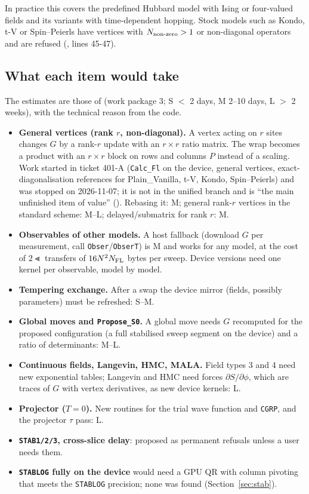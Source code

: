 In practice this covers the predefined Hubbard model with Ising or four-valued fields and its variants with time-dependent hopping. Stock models such as Kondo, t-V or Spin--Peierls have vertices with $N_{\rm non\text{-}zero}>1$ or non-diagonal operators and are refused (, lines 45-47).

\subsection{What each item would take}

The estimates are those of  (work package 3; S $<$ 2 days, M 2--10 days, L $>$ 2 weeks), with the technical reason from the code.
\begin{itemize}
\item \textbf{General vertices (rank $r$, non-diagonal).} A vertex acting on $r$ sites changes $G$ by a rank-$r$ update with an $r\times r$ ratio matrix. The wrap becomes a product with an $r\times r$ block on rows and columns $P$ instead of a scaling. Work started in ticket 401-A (\texttt{Calc\_Fl} on the device, general vertices, exact-diagonalisation references for Plain\_Vanilla, t-V, Kondo, Spin--Peierls) and was stopped on 2026-11-07; it is not in the unified branch and is ``the main unfinished item of value'' (). Rebasing it: M; general rank-$r$ vertices in the standard scheme: M--L; delayed/submatrix for rank $r$: M.
\item \textbf{Observables of other models.} A host fallback (download $G$ per measurement, call \texttt{Obser}/\texttt{ObserT}) is M and works for any model, at the cost of $2\Lt$ transfers of $16N^2N_{\rm FL}$ bytes per sweep. Device versions need one kernel per observable, model by model.
\item \textbf{Tempering exchange.} After a swap the device mirror (fields, possibly parameters) must be refreshed: S--M.
\item \textbf{Global moves and \texttt{Propose\_S0}.} A global move needs $G$ recomputed for the proposed configuration (a full stabilised sweep segment on the device) and a ratio of determinants: M--L.
\item \textbf{Continuous fields, Langevin, HMC, MALA.} Field types 3 and 4 need new exponential tables; Langevin and HMC need forces $\partial S/\partial\phi$, which are traces of $G$ with vertex derivatives, as new device kernels: L.
\item \textbf{Projector ($T=0$).} New routines for the trial wave function and \texttt{CGRP}, and the projector $\tau$ pass: L.
\item \textbf{\texttt{STAB1/2/3}, cross-slice delay}: proposed as permanent refusals unless a user needs them.
\item \textbf{\texttt{STABLOG} fully on the device} would need a GPU QR with column pivoting that meets the \texttt{STABLOG} precision; none was found (Section~\ref{sec:stab}).
\end{itemize}

